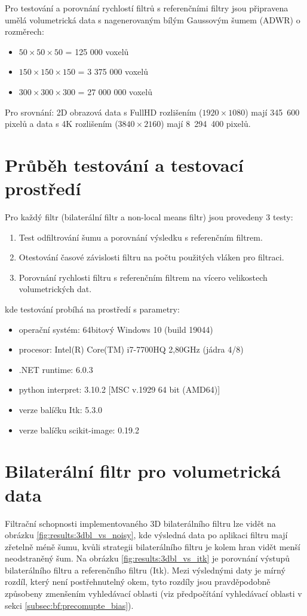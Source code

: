 Pro testování a porovnání rychlostí filtrů s referenčními filtry jsou připravena umělá volumetrická data s nagenerovaným bílým Gaussovým šumem (ADWR) o rozměrech:
\begin{itemize}
    \item $50\times50\times50$ = 125 000 voxelů
    \item $150\times150\times150$ = 3 375 000 voxelů
    \item $300\times300\times300$ = 27 000 000 voxelů
\end{itemize}
Pro srovnání: 2D obrazová data s FullHD rozlišením ($1920\times1080$) mají 345 600 pixelů a data s 4K rozlišením ($3840\times2160$) mají 8 294 400 pixelů.

\section{Průběh testování a testovací prostředí}
\label{sec:results:testing}
Pro každý filtr (bilaterální filtr a non-local means filtr) jsou provedeny 3 testy:
\begin{enumerate}
    \item Test odfiltrování šumu a porovnání výsledku s referenčním filtrem.
    \item Otestování časové závislosti filtru na počtu použitých vláken pro filtraci.
    \item Porovnání rychlosti filtru s referenčním filtrem na vícero velikostech volumetrických dat.
\end{enumerate}
kde testování probíhá na prostředí s parametry:
\begin{itemize}
    \item operační systém: 64bitový Windows 10 (build 19044)
    \item procesor: Intel(R) Core(TM) i7-7700HQ 2,80GHz (jádra 4/8)
    \item .NET runtime: 6.0.3
    \item python interpret: 3.10.2 [MSC v.1929 64 bit (AMD64)]
    \item verze balíčku Itk: 5.3.0
    \item verze balíčku scikit-image: 0.19.2
\end{itemize}

\section{Bilaterální filtr pro volumetrická data}
\label{sec:results:bl}
Filtrační schopnosti implementovaného 3D bilaterálního filtru lze vidět na obrázku \ref{fig:results:3dbl_vs_noisy}, kde výsledná data po aplikaci filtru mají zřetelně méně šumu, kvůli strategii bilaterálního filtru je kolem hran vidět menší neodstraněný šum. 
Na obrázku \ref{fig:results:3dbl_vs_itk} je porovnání výstupů bilaterálního filtru a referenčního filtru (Itk). Mezi výslednými daty je mírný rozdíl, který není postřehnutelný okem, tyto rozdíly jsou pravděpodobně způsobeny zmenšením vyhledávací oblasti (viz předpočítání vyhledávací oblasti v sekci \ref{subsec:bf:precomupte_bias}).

